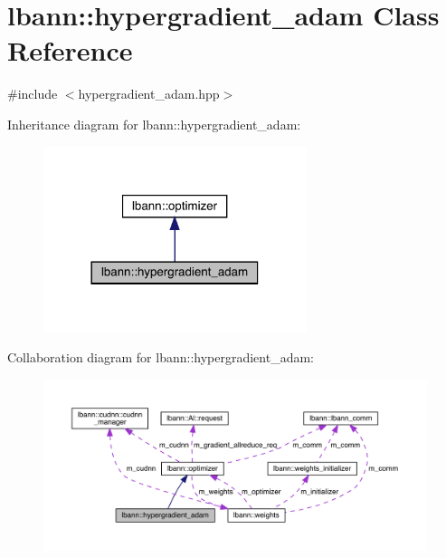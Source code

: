 \hypertarget{classlbann_1_1hypergradient__adam}{}\section{lbann\+:\+:hypergradient\+\_\+adam Class Reference}
\label{classlbann_1_1hypergradient__adam}


{\ttfamily \#include $<$hypergradient\+\_\+adam.\+hpp$>$}



Inheritance diagram for lbann\+:\+:hypergradient\+\_\+adam\+:\nopagebreak
\begin{figure}[H]
\begin{center}
\leavevmode
\includegraphics[width=218pt]{classlbann_1_1hypergradient__adam__inherit__graph}
\end{center}
\end{figure}


Collaboration diagram for lbann\+:\+:hypergradient\+\_\+adam\+:\nopagebreak
\begin{figure}[H]
\begin{center}
\leavevmode
\includegraphics[width=350pt]{classlbann_1_1hypergradient__adam__coll__graph}
\end{center}
\end{figure}
